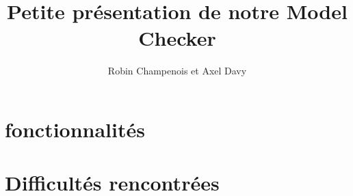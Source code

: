 \documentclass[a4paper]{article}
\author{Robin Champenois et Axel Davy}
\title{Petite présentation de notre Model Checker}
\begin{document}
\maketitle

\section{fonctionnalités}
\begin{itemize}

\end{itemize}
\section{Difficultés rencontrées}
\end{document}
